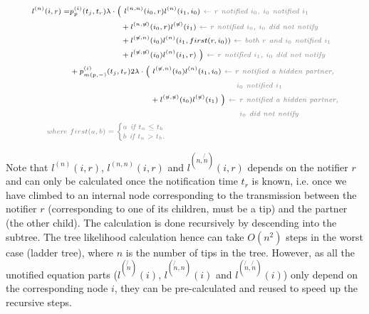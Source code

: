 \documentclass[10pt,letterpaper]{article}
\begin{document}
\begin{equation}
\scriptsize
\begin{split}
l^{(n)}(i, r) = &p_{p}^{(i)}(t_j,t_r) \lambda \cdot
\Big(~l^{(n,n)}(i_0,r)l^{(n)}(i_1,i_0) \textit{\color{gray}~$\leftarrow$ $r$ notified $i_0$, $i_0$  notified $i_1$} \\
&~~~~~~~~~~~~~~~~~~~+ l^{(n,\not{n})}(i_0,r)l^{(\not{n})}(i_1) \textit{\color{gray}~$\leftarrow$  $r$ notified $i_0$, $i_0$ did not notify} \\
&~~~~~~~~~~~~~~~~~~~+l^{(\not{n}, n)}(i_0)l^{(n)}(i_1,first(r,i_0)) \textit{\color{gray}~$\leftarrow$ both $r$ and $i_0$ notified $i_1$} \\
&~~~~~~~~~~~~~~~~~~~+ l^{(\not{n},\not{n})}(i_0)l^{(n)}(i_1,r)~\Big) \textit{\color{gray}~$\leftarrow$ $r$ notified $i_1$, $i_0$ did not notify} 
\\
&+ p_{m(p,-)}^{(i)}(t_j,t_r) 2\lambda \cdot
\Big(~l^{(\not{n},n)}(i_0)l^{(n)}(i_1,i_0) \textit{\color{gray}~$\leftarrow$ $r$ notified a hidden partner,} \\
&\textit{\color{gray}~~~~~~~~~~~~~~~~~~~~~~~~~~~~~~~~~~~~~~~~~~~~~~~~~~~~~~~~$i_0$ notified $i_1$} \\
&~~~~~~~~~~~~~~~~~~~~~~~~~~~~~~+ l^{(\not{n},\not{n})}(i_0)l^{(\not{n})}(i_1)~\Big) \textit{\color{gray}~$\leftarrow$ $r$ notified a hidden partner,} \\
&\textit{\color{gray}~~~~~~~~~~~~~~~~~~~~~~~~~~~~~~~~~~~~~~~~~~~~~~~~~~~~~~~~ $i_0$ did not notify}\\
\textit{\color{gray}~where } &\color{gray}first(a,b) = 
\begin{cases}
a \textit{~if $t_a \leq t_b$}\\
b \textit{~if $t_a > t_b$.}
\end{cases} 
 \end{split}
\label{eq:lp-tip-int}
\end{equation}

\bigskip 
Note that $l^{(n)}(i, r)$, $l^{(n,n)}(i, r)$ and $l^{(n,\not{n})}(i, r)$ depends on the notifier $r$ and can only be calculated once the notification time $t_r$ is known, i.e. once we have climbed to an internal node corresponding to the transmission between the notifier $r$ (corresponding to one of its children, must be a tip) and the partner (the other child). The calculation is done recursively by descending into the subtree. The tree likelihood calculation hence can take $O(n^2)$ steps in the worst case (ladder tree), where $n$ is the number of tips in the tree. However, as all the unotified equation parts ($l^{(\not{n})}(i)$, $l^{(\not{n},n)}(i)$ and $l^{(\not{n},\not{n})}(i)$) only depend on the corresponding node $i$, they can be pre-calculated and reused to speed up the recursive steps.
\end{document}
